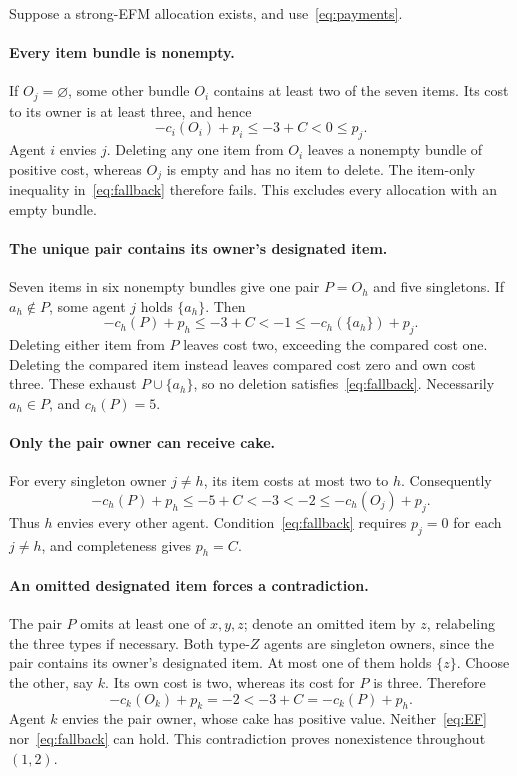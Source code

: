 \documentclass[11pt,a4paper]{article}
\begin{document}
Suppose a strong-EFM allocation exists, and use~\eqref{eq:payments}.

\paragraph{Every item bundle is nonempty.}
If $O_j=\varnothing$, some other bundle $O_i$ contains at least two of
the seven items. Its cost to its owner is at least three, and hence
\[
 -c_i(O_i)+p_i\leq-3+C<0\leq p_j.
\]
Agent $i$ envies $j$. Deleting any one item from $O_i$ leaves a
nonempty bundle of positive cost, whereas $O_j$ is empty and has no
item to delete. The item-only inequality in~\eqref{eq:fallback}
therefore fails. This excludes every allocation with an empty bundle.

\paragraph{The unique pair contains its owner's designated item.}
Seven items in six nonempty bundles give one pair $P=O_h$ and five
singletons. If $a_h\notin P$, some agent $j$ holds $\{a_h\}$. Then
\[
 -c_h(P)+p_h\leq-3+C<-1
 \leq-c_h(\{a_h\})+p_j.
\]
Deleting either item from $P$ leaves cost two, exceeding the compared
cost one. Deleting the compared item instead leaves compared cost zero
and own cost three. These exhaust $P\cup\{a_h\}$, so no deletion
satisfies~\eqref{eq:fallback}. Necessarily $a_h\in P$, and $c_h(P)=5$.

\paragraph{Only the pair owner can receive cake.}
For every singleton owner $j\ne h$, its item costs at most two to $h$.
Consequently
\[
 -c_h(P)+p_h\leq-5+C<-3<-2
 \leq-c_h(O_j)+p_j.
\]
Thus $h$ envies every other agent. Condition~\eqref{eq:fallback}
requires $p_j=0$ for each $j\ne h$, and completeness gives $p_h=C$.

\paragraph{An omitted designated item forces a contradiction.}
The pair $P$ omits at least one of $x,y,z$; denote an omitted item by
$z$, relabeling the three types if necessary. Both type-$Z$ agents
are singleton owners, since the pair contains its owner's designated
item. At most one of them holds $\{z\}$. Choose the other, say $k$.
Its own cost is two, whereas its cost for $P$ is three. Therefore
\[
 -c_k(O_k)+p_k=-2<-3+C=-c_k(P)+p_h.
\]
Agent $k$ envies the pair owner, whose cake has positive value.
Neither~\eqref{eq:EF} nor~\eqref{eq:fallback} can hold. This
contradiction proves nonexistence throughout $(1,2)$.
\end{document}
